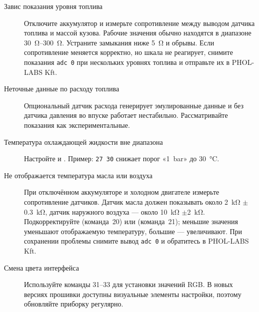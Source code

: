 \begin{description}
    \item[Завис показания уровня топлива] Отключите аккумулятор и измерьте сопротивление между выводом датчика топлива и массой кузова. Рабочие значения обычно находятся в диапазоне \SIrange{30}{300}{\ohm}. Устраните замыкания ниже \SI{5}{\ohm} и обрывы. Если сопротивление меняется корректно, но шкала не реагирует, снимите показания \verb|adc 0| при нескольких уровнях топлива и отправьте их в PHOL-LABS Kft.
    \item[Неточные данные по расходу топлива] Опциональный датчик расхода генерирует эмулированные данные и без датчика давления во впуске работает нестабильно. Рассматривайте показания как экспериментальные.
    \item[Температура охлаждающей жидкости вне диапазона] Настройте  и . Пример: \verb|27 30| снижает порог «1~bar» до \SI{30}{\celsius}.
    \item[Не отображается температура масла или воздуха] При отключённом аккумуляторе и холодном двигателе измерьте сопротивление датчиков. Датчик масла должен показывать около \SI{2}{\kilo\ohm} \ensuremath{\pm}\SI{0.3}{\kilo\ohm}, датчик наружного воздуха — около \SI{10}{\kilo\ohm} \ensuremath{\pm}\SI{2}{\kilo\ohm}. Подкорректируйте  (команда~20) или  (команда~21); меньшие значения уменьшают отображаемую температуру, большие — увеличивают. При сохранении проблемы снимите вывод \verb|adc 0| и обратитесь в PHOL-LABS Kft.
    \item[Смена цвета интерфейса] Используйте команды 31--33 для установки значений RGB. В новых версиях прошивки доступны визуальные элементы настройки, поэтому обновляйте приборку регулярно.
\end{description}

